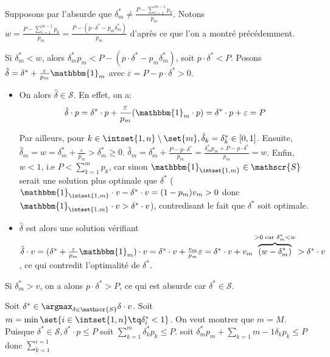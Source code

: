 \documentclass{scrartcl}
\begin{document}
				\begin{demo}
					\item Supposons par l'absurde que $\delta_m^* \neq \frac{P-\sum_{i=1}^{m-1}p_k}{p_m}$. 
						Notons $w = \frac{P-\sum_{i=1}^{m-1} p_k}{p_m} 
							= \frac{P-(p\cdot \delta^* - p_m\delta_m^*)}{p_m}$ d'après ce que l'on a montré précédemment.

						\item Si $\delta_m^* < w$, alors $\delta_m^*p_m < P - (p\cdot\delta^* - p_m\delta_m^*)$, soit $p\cdot\delta^* < P$.
						Posons $\hat{\delta} = \delta^* + \frac{\varepsilon}{p_m}\mathbbm{1}_m$ avec $\varepsilon = P - p\cdot\delta^* > 0$.
						\begin{itemize}
							\item On alors $\hat{\delta} \in \mathscr{S}$. En effet, on a:
							\[
								\hat{\delta}\cdot p = \delta^*\cdot p + \frac{\varepsilon}{p_m}(\mathbbm{1}_m \cdot p) = \delta^*\cdot p + \varepsilon = P
							\]

							Par ailleurs, pour $k \in \intset{1,n}\setminus\set{m}, \hat{\delta}_k = \delta_k^* \in [0,1]$. 
							Ensuite, $\hat{\delta}_m = w = \delta^*_m + \frac{\varepsilon}{p_m} > \delta^*_m \geq 0$.
							$\hat{\delta}_m = \delta_m^* + \frac{P - p\cdot\delta^*}{p_m} = \frac{\delta_m^*p_m + P - p\cdot\delta^*}{p_m} = w$.
							Enfin, $w < 1$, i.e $P < \sum_{k=1}^m p_k$, car sinon $\mathbbm{1}_{\intset{1,m}} \in \mathscr{S}$ serait une solution plus optimale que $\delta^*$
							($\mathbbm{1}_{\intset{1,m}}\cdot v - \delta^* \cdot v = (1-p_m)v_m > 0$ donc $\mathbbm{1}_{\intset{1,m}}\cdot v > \delta^*\cdot v$),
							contredisant le fait que $\delta^*$ soit optimale.

							\item $\hat{\delta}$ est alors une solution vérifiant $\hat{\delta}\cdot v 
								= (\delta^* + \frac{\varepsilon}{p_m}\mathbbm{1}_m)\cdot v 
								= \delta^*\cdot v + \frac{v_m}{p_m}\varepsilon 
								= \delta^*\cdot v + v_m \overbrace{(w-\delta^*_m)}^{> 0 \text{ car } \delta^*_m < w}> \delta^*\cdot v$,
								ce qui contredit l'optimalité de $\delta^*$. 
						\end{itemize}

					\item Si $\delta_m^* > v$, on a alons $p\cdot \delta^* > P$, ce qui est absurde car $\delta^* \in \mathscr{S}$. 
				\end{demo}

				\begin{demo}
					\item Soit $\delta^* \in \argmax_{\delta\in\mathscr{S}} \delta\cdot v$. Soit $m = \min \set{i \in \intset{1,n} \tq \delta_i^* < 1}$.
						On veut montrer que $m = M$. Puisque $\delta^* \in \mathscr{S}, \delta^*\cdot p \leq P$ soit $\sum_{k=1}^m \delta_k^* p_k \leq P$.
						soit $\delta_m^*p_m + \sum_{k=1}{m-1} \delta_k p_k \leq P$ donc $\sum_{k=1}^{i=1}$
				\end{demo}
		
\end{document}
